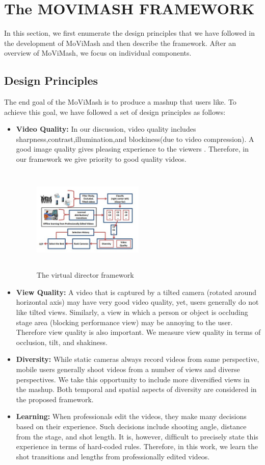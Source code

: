 \documentclass{sig-alternate}
\begin{document}
\section{The MOVIMASH FRAMEWORK}
In this section, we ﬁrst enumerate the design principles that we have followed in the development of MoViMash and then describe the framework. After an overview of MoViMash, we focus on individual components.



\subsection{Design Principles}
The end goal of the MoViMash is to produce a mashup that users like. To achieve this goal, we have followed a set of design principles as follows:
\begin{itemize}
\item  \textbf{Video Quality:} In our discussion, video quality includes sharpness,contrast,illumination,and blockiness(due to video compression). A good image quality gives pleasing experience to the viewers \cite{piron1976foundations}. Therefore, in our framework we give priority to good quality videos. 
 \begin{figure}[h]
\includegraphics[width=0.5\textwidth ,height = 5cm]{image2}
\caption{The virtual director framework}
\label{fig:figure2}
\end{figure}

\item \textbf{View Quality:} A video that is captured by a tilted camera (rotated around horizontal axis) may have very good video quality, yet, users generally do not like tilted views. Similarly, a view in which a person or object is occluding stage area (blocking performance view) may be annoying to the user. Therefore view quality is also important. We measure view quality in terms of occlusion, tilt, and shakiness. 
\item \textbf{Diversity:} While static cameras always record videos from same perspective, mobile users generally shoot videos from a number of views and diverse perspectives. We take this opportunity to include more diversiﬁed views in the mashup. Both temporal and spatial aspects of diversity are considered in the proposed framework. 
\item \textbf{Learning:} When professionals edit the videos, they make many decisions based on their experience. Such decisions include shooting angle, distance from the stage, and shot length. It is, however, difﬁcult to precisely state this experience in terms of hard-coded rules. Therefore, in this work, we learn the shot transitions and lengths from professionally edited videos.
\end{itemize}
\end{document}
